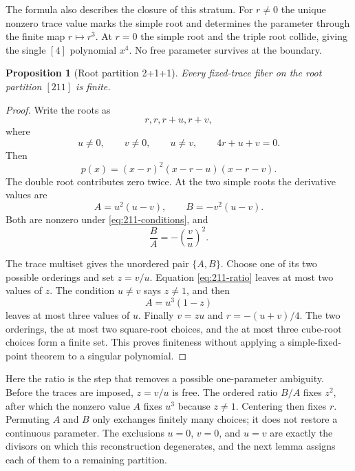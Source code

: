 \documentclass[11pt]{article}
\newtheorem{proposition}[theorem]{Proposition}
\theoremstyle{definition}
\begin{document}
The formula also describes the closure of this stratum. For $r\ne0$ the unique nonzero trace value marks the simple root and determines the parameter through the finite map $r\mapsto r^3$. At $r=0$ the simple root and the triple root collide, giving the single $[4]$ polynomial $x^4$. No free parameter survives at the boundary.

\begin{proposition}[Root partition 2+1+1]
\label{prop:211}
Every fixed-trace fiber on the root partition $[211]$ is finite.
\end{proposition}

\begin{proof}
Write the roots as
\[
r,r,r+u,r+v,
\]
where
\begin{equation}
u\ne0,
\qquad v\ne0,
\qquad u\ne v,
\qquad 4r+u+v=0.
\label{eq:211-conditions}
\end{equation}
Then
\[
p(x)=(x-r)^2(x-r-u)(x-r-v).
\]
The double root contributes zero twice. At the two simple roots the derivative values are
\begin{equation}
A=u^2(u-v),
\qquad
B=-v^2(u-v).
\label{eq:211-AB}
\end{equation}
Both are nonzero under \eqref{eq:211-conditions}, and
\begin{equation}
\frac BA=-\left(\frac vu\right)^2.
\label{eq:211-ratio}
\end{equation}

The trace multiset gives the unordered pair $\{A,B\}$. Choose one of its two possible orderings and set $z=v/u$. Equation \eqref{eq:211-ratio} leaves at most two values of $z$. The condition $u\ne v$ says $z\ne1$, and then
\begin{equation}
A=u^3(1-z)
\label{eq:211-recover-u}
\end{equation}
leaves at most three values of $u$. Finally $v=zu$ and $r=-(u+v)/4$. The two orderings, the at most two square-root choices, and the at most three cube-root choices form a finite set. This proves finiteness without applying a simple-fixed-point theorem to a singular polynomial.
\end{proof}

Here the ratio is the step that removes a possible one-parameter ambiguity. Before the traces are imposed, $z=v/u$ is free. The ordered ratio $B/A$ fixes $z^2$, after which the nonzero value $A$ fixes $u^3$ because $z\ne1$. Centering then fixes $r$. Permuting $A$ and $B$ only exchanges finitely many choices; it does not restore a continuous parameter. The exclusions $u=0$, $v=0$, and $u=v$ are exactly the divisors on which this reconstruction degenerates, and the next lemma assigns each of them to a remaining partition.
\end{document}
